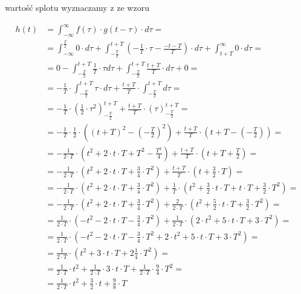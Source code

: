 \begin{task}
wartość splotu wyznaczamy z ze wzoru

\begin{align*}
h(t)&=\int_{-\infty}^{\infty} f(\tau) \cdot g(t-\tau) \cdot d\tau=\\
&=\int_{-\infty}^{\frac{T}{2}} 0 \cdot d\tau + \int_{-\frac{T}{2}}^{t+T}\left( -\frac{1}{T}\cdot \tau - \frac{-t-T}{T} \right)\cdot d\tau +\int_{t+T}^{\infty} 0 \cdot d\tau=\\
&=0 - \int_{-\frac{T}{2}}^{t+T} \frac{1}{T}\cdot \tau d\tau + \int_{-\frac{T}{2}}^{t+T} \frac{t+T}{T} \cdot d\tau +0=\\
&=- \frac{1}{T}\cdot \int_{-\frac{T}{2}}^{t+T} \tau \cdot d\tau + \frac{t+T}{T} \cdot \int_{-\frac{T}{2}}^{t+T} d\tau=\\
&=- \frac{1}{T}\cdot \left( \frac{1}{2} \cdot \tau^2 \right)_{-\frac{T}{2}}^{t+T} + \frac{t+T}{T} \cdot \left(\tau \right)_{-\frac{T}{2}}^{t+T}=\\
&=- \frac{1}{T}\cdot \frac{1}{2} \cdot \left(  \left(t+T\right)^2 -\left(-\frac{T}{2}\right)^2 \right) + \frac{t+T}{T} \cdot \left(t+T - \left(-\frac{T}{2}\right) \right)=\\
&=- \frac{1}{2\cdot T} \cdot \left(  t^2+2\cdot t\cdot T + T^2 -\frac{T^2}{4} \right) + \frac{t+T}{T} \cdot \left(t+T + \frac{T}{2} \right)=\\
&=- \frac{1}{2\cdot T} \cdot \left(  t^2+2\cdot t\cdot T + \frac{3}{4}\cdot T^2 \right) + \frac{t+T}{T} \cdot \left(t+\frac{3}{2}\cdot T\right)=\\
&=- \frac{1}{2\cdot T} \cdot \left(  t^2+2\cdot t\cdot T + \frac{3}{4}\cdot T^2 \right) + \frac{1}{T} \cdot \left(t^2 + \frac{3}{2} \cdot t \cdot T + t\cdot T +\frac{3}{2}\cdot T^2\right)=\\
&=- \frac{1}{2\cdot T} \cdot \left(  t^2+2\cdot t\cdot T + \frac{3}{4}\cdot T^2 \right) + \frac{2}{2\cdot T} \cdot \left(t^2 + \frac{5}{2} \cdot t \cdot T+\frac{3}{2}\cdot T^2\right)=\\
&=\frac{1}{2\cdot T} \cdot \left(  -t^2-2\cdot t\cdot T - \frac{3}{4}\cdot T^2 \right) + \frac{1}{2\cdot T} \cdot \left(2\cdot t^2 + 5 \cdot t \cdot T+3\cdot T^2\right)=\\
&=\frac{1}{2\cdot T} \cdot \left(  -t^2-2\cdot t\cdot T - \frac{3}{4}\cdot T^2 + 2\cdot t^2 + 5 \cdot t \cdot T+3\cdot T^2\right)=\\
&=\frac{1}{2\cdot T} \cdot \left( t^2 + 3 \cdot t \cdot T+2 \frac{1}{4} \cdot  T^2\right)=\\
&=\frac{1}{2\cdot T} \cdot t^2 + \frac{1}{2 \cdot T} \cdot 3 \cdot t \cdot T+\frac{1}{2\cdot T} \cdot \frac{9}{4} \cdot  T^2=\\
&=\frac{1}{2\cdot T} \cdot t^2 + \frac{3}{2} \cdot t+\frac{9}{8} \cdot  T
\end{align*}


\end{task}
